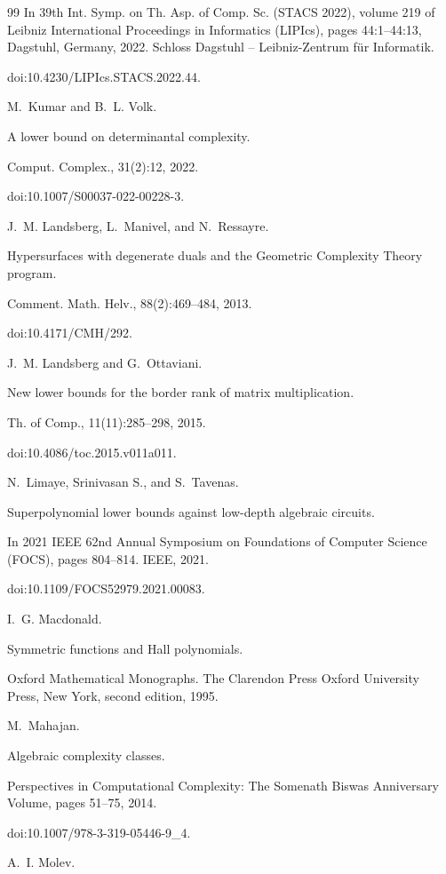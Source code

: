 \documentclass[10pt,a4paper]{article}
\begin{document}
\begin{thebibliography}{99}
In 39th Int. Symp. on Th. Asp. of Comp. Sc. (STACS 2022),
volume 219 of Leibniz International Proceedings in Informatics
(LIPIcs), pages 44:1–44:13, Dagstuhl, Germany, 2022. Schloss Dagstuhl –
Leibniz-Zentrum für Informatik.


doi:10.4230/LIPIcs.STACS.2022.44.

M. Kumar and B. L. Volk.


A lower bound on determinantal complexity.


Comput. Complex., 31(2):12, 2022.


doi:10.1007/S00037-022-00228-3.

J. M. Landsberg, L. Manivel, and N. Ressayre.


Hypersurfaces with degenerate duals and the Geometric Complexity
Theory program.


Comment. Math. Helv., 88(2):469–484, 2013.


doi:10.4171/CMH/292.

J. M. Landsberg and G. Ottaviani.


New lower bounds for the border rank of matrix multiplication.


Th. of Comp., 11(11):285–298, 2015.


doi:10.4086/toc.2015.v011a011.

N. Limaye, Srinivasan S., and S. Tavenas.


Superpolynomial lower bounds against low-depth algebraic circuits.


In 2021 IEEE 62nd Annual Symposium on Foundations of Computer
Science (FOCS), pages 804–814. IEEE, 2021.


doi:10.1109/FOCS52979.2021.00083.

I. G. Macdonald.


Symmetric functions and Hall polynomials.


Oxford Mathematical Monographs. The Clarendon Press Oxford
University Press, New York, second edition, 1995.

M. Mahajan.


Algebraic complexity classes.


Perspectives in Computational Complexity: The Somenath Biswas
Anniversary Volume, pages 51–75, 2014.


doi:10.1007/978-3-319-05446-9\_4.

A. I. Molev.



\end{thebibliography}
\end{document}
